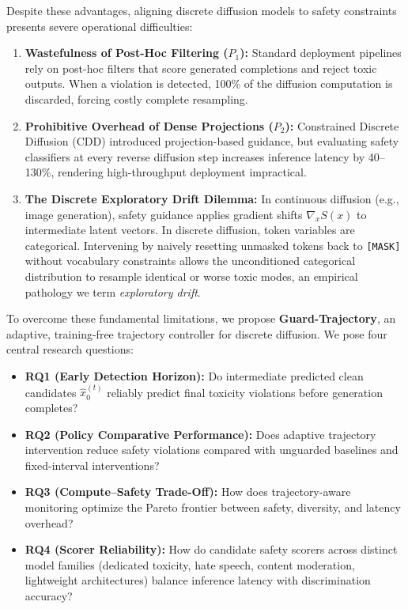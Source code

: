 \documentclass[11pt]{article}
\begin{document}
Despite these advantages, aligning discrete diffusion models to safety constraints presents severe operational difficulties:
\begin{enumerate}
    \item \textbf{Wastefulness of Post-Hoc Filtering ($P_1$):} Standard deployment pipelines rely on post-hoc filters that score generated completions and reject toxic outputs. When a violation is detected, 100\% of the diffusion computation is discarded, forcing costly complete resampling.
    \item \textbf{Prohibitive Overhead of Dense Projections ($P_2$):} Constrained Discrete Diffusion (CDD) \cite{cardei2025cdd} introduced projection-based guidance, but evaluating safety classifiers at every reverse diffusion step increases inference latency by 40--130\%, rendering high-throughput deployment impractical.
    \item \textbf{The Discrete Exploratory Drift Dilemma:} In continuous diffusion (e.g., image generation), safety guidance applies gradient shifts $\nabla_x S(x)$ to intermediate latent vectors. In discrete diffusion, token variables are categorical. Intervening by naively resetting unmasked tokens back to \texttt{[MASK]} without vocabulary constraints allows the unconditioned categorical distribution to resample identical or worse toxic modes, an empirical pathology we term \textit{exploratory drift}.
\end{enumerate}

To overcome these fundamental limitations, we propose \textbf{Guard-Trajectory}, an adaptive, training-free trajectory controller for discrete diffusion. We pose four central research questions:
\begin{itemize}
    \item \textbf{RQ1 (Early Detection Horizon):} Do intermediate predicted clean candidates $\hat{x}_0^{(t)}$ reliably predict final toxicity violations before generation completes?
    \item \textbf{RQ2 (Policy Comparative Performance):} Does adaptive trajectory intervention reduce safety violations compared with unguarded baselines and fixed-interval interventions?
    \item \textbf{RQ3 (Compute--Safety Trade-Off):} How does trajectory-aware monitoring optimize the Pareto frontier between safety, diversity, and latency overhead?
    \item \textbf{RQ4 (Scorer Reliability):} How do candidate safety scorers across distinct model families (dedicated toxicity, hate speech, content moderation, lightweight architectures) balance inference latency with discrimination accuracy?
\end{itemize}
\end{document}
